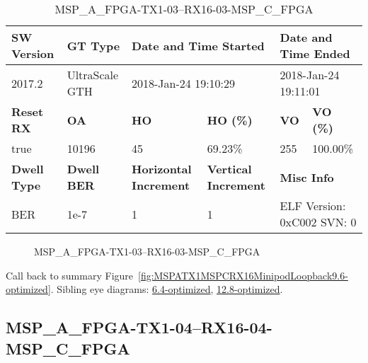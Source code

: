 \begin{table}[h]
\centering
\caption{MSP\_A\_FPGA-TX1-03--RX16-03-MSP\_C\_FPGA}
\label{tab:MSPAFPGATX103RX1603MSPCFPGA9.6-optimized}
\begin{tabular}{@{}|l|l|l|l|l|l|@{}}
\toprule
\textbf{SW Version}                & \textbf{GT Type}   & \multicolumn{2}{l|}{\textbf{Date and Time Started}}            & \multicolumn{2}{l|}{\textbf{Date and Time Ended}}        \\ \midrule
2017.2                       & UltraScale GTH          & \multicolumn{2}{l|}{2018-Jan-24 19:10:29}                   & \multicolumn{2}{l|}{2018-Jan-24 19:11:01}               \\ \midrule
\textbf{Reset RX}                  & \textbf{OA} & \textbf{HO}   & \textbf{HO (\%)} & \textbf{VO} & \textbf{VO (\%)} \\ \midrule
true & 10196        & 45          & 69.23\%        & 255        & 100.00\%       \\ \midrule
\textbf{Dwell Type}                & \textbf{Dwell BER} & \textbf{Horizontal Increment} & \textbf{Vertical Increment}    & \multicolumn{2}{l|}{\textbf{Misc Info}}                  \\ \midrule
BER                            & 1e-7        & 1        & 1           & \multicolumn{2}{l|}{ELF Version: 0xC002 SVN: 0}                         \\ \bottomrule
\end{tabular}
\end{table}

\begin{figure}[h]
\caption{MSP\_A\_FPGA-TX1-03--RX16-03-MSP\_C\_FPGA} \label{fig:MSPAFPGATX103RX1603MSPCFPGA9.6-optimized}
\end{figure}

Call back to summary Figure~\ref{fig:MSPATX1MSPCRX16MinipodLoopback9.6-optimized}.
Sibling eye diagrams: \hyperref[sec:MSPAFPGATX103RX1603MSPCFPGA6.4-optimized]{6.4-optimized}, \hyperref[sec:MSPAFPGATX103RX1603MSPCFPGA12.8-optimized]{12.8-optimized}.

\clearpage
\newpage


\subsection{MSP\_A\_FPGA-TX1-04--RX16-04-MSP\_C\_FPGA}\label{sec:MSPAFPGATX104RX1604MSPCFPGA9.6-optimized}

